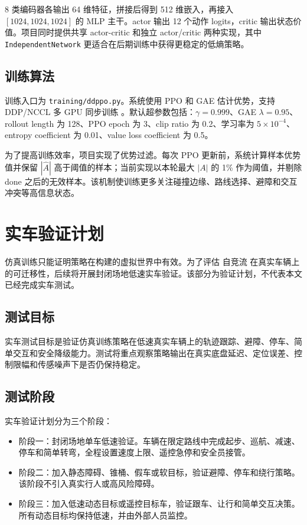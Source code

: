 \documentclass[preprint,12pt]{elsarticle}
\newcommand{\Zijingliu}{自竞流}
\begin{document}
8 类编码器各输出 64 维特征，拼接后得到 512 维嵌入，再接入 $[1024,1024,1024]$ 的 MLP 主干。actor 输出 12 个动作 logits，critic 输出状态价值。项目同时提供共享 actor-critic 和独立 actor/critic 两种实现，其中 \texttt{IndependentNetwork} 更适合在后期训练中获得更稳定的低熵策略。

\subsection{训练算法}

训练入口为 \texttt{training/ddppo.py}。系统使用 PPO \citep{schulman2017ppo} 和 GAE \citep{schulman2016gae} 估计优势，支持 DDP/NCCL 多 GPU 同步训练 \citep{wijmans2020ddppo}。默认超参数包括：$\gamma=0.999$、GAE $\lambda=0.95$、rollout length 为 128、PPO epoch 为 3、clip ratio 为 0.2、学习率为 $5\times10^{-4}$、entropy coefficient 为 0.01、value loss coefficient 为 0.5。

为了提高训练效率，项目实现了优势过滤。每次 PPO 更新前，系统计算样本优势值并保留 $|\hat A|$ 高于阈值的样本；当前实现以本轮最大 $|A|$ 的 1\% 作为阈值，并剔除 done 之后的无效样本。该机制使训练更多关注碰撞边缘、路线选择、避障和交互冲突等高信息状态。

\section{实车验证计划}

仿真训练只能证明策略在构建的虚拟世界中有效。为了评估 \Zijingliu{} 在真实车辆上的可迁移性，后续将开展封闭场地低速实车验证。该部分为验证计划，不代表本文已经完成实车测试。

\subsection{测试目标}

实车测试目标是验证仿真训练策略在低速真实车辆上的轨迹跟踪、避障、停车、简单交互和安全降级能力。测试将重点观察策略输出在真实底盘延迟、定位误差、控制限幅和传感噪声下是否仍保持稳定。

\subsection{测试阶段}

实车验证计划分为三个阶段：
\begin{itemize}
  \item 阶段一：封闭场地单车低速验证。车辆在限定路线中完成起步、巡航、减速、停车和简单转弯，全程设置速度上限、遥控急停和安全员接管。
  \item 阶段二：加入静态障碍、锥桶、假车或软目标，验证避障、停车和绕行策略。该阶段不引入真实行人或高风险障碍。
  \item 阶段三：加入低速动态目标或遥控目标车，验证跟车、让行和简单交互决策。所有动态目标均保持低速，并由外部人员监控。
\end{itemize}
\end{document}
